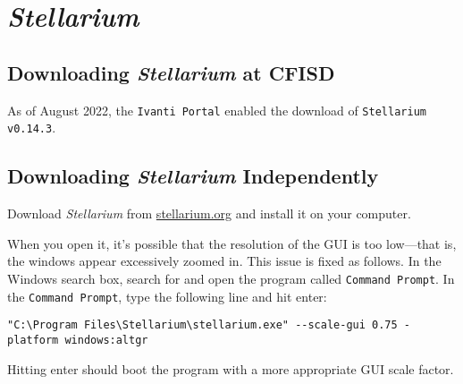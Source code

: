 \documentclass{article}
\begin{document}
\section*{\textit{Stellarium}}

\subsection*{Downloading \textit{Stellarium} at CFISD}

As of August 2022, the \texttt{Ivanti Portal} enabled the download of \texttt{Stellarium v0.14.3}.

\subsection*{Downloading \textit{Stellarium} Independently}
Download \textit{Stellarium} from \href{https://stellarium.org/}{stellarium.org} and install it on your computer.

When you open it, it's possible that the resolution of the GUI is too low---that is, the windows appear excessively zoomed in. This issue is fixed as follows. In the Windows search box, search for and open the program called \texttt{Command Prompt}. In the \texttt{Command Prompt}, type the following line and hit enter:

\begin{center}
    \verb|"C:\Program Files\Stellarium\stellarium.exe" --scale-gui 0.75 -platform windows:altgr|
\end{center}

Hitting enter should boot the program with a more appropriate GUI scale factor.








\printglossaries
\end{document}
